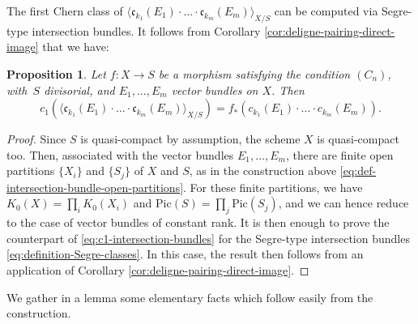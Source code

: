 \documentclass[JEP,XML,SOM,Unicode,published]{cedram}
\theoremstyle{plain}
\newtheorem{proposition}[theorem]{Proposition}
\theoremstyle{definition}
\newcommand{\cfrak}{\mathfrak c}
\newcommand{\Pic}{\mathrm{Pic}}
\begin{document}
The first Chern class of $\langle \cfrak_{k_{1}}(E_{1})\cdot\ldots \cdot \cfrak_{k_{m}}(E_{m})\rangle_{X/S}$ can be computed via Segre-type intersection bundles. It follows from Corollary \ref{cor:deligne-pairing-direct-image} that we have:
\begin{proposition}\label{prop:chernclassofIntbundle}
Let $f\colon X \to S$ be a morphism satisfying the condition $(C_n)$, with~$S$ divisorial, and $E_1, \ldots, E_m$ vector bundles on $X$. Then
\begin{equation}\label{eq:c1-intersection-bundles}
c_1 (\langle \cfrak_{k_{1}}(E_{1})\cdot\ldots \cdot \cfrak_{k_{m}}(E_{m})\rangle_{X/S}) = f_\ast (c_{k_{1}}(E_{1})\cdot\ldots \cdot c_{k_{m}}(E_{m}) ).
\end{equation}
\end{proposition}
\begin{proof}
Since $S$ is quasi-compact by assumption, the scheme $X$ is quasi-compact too. Then, associated with the vector bundles $E_{1},\ldots, E_{m}$, there are finite open partitions $\lbrace X_{i}\rbrace$ and $\lbrace S_{j}\rbrace$ of $X$ and $S$, as in the construction above \eqref{eq:def-intersection-bundle-open-partitions}. For these finite partitions, we have $K_{0}(X)=\prod_{i}K_{0}(X_{i})$ and $\Pic(S)=\prod_{j}\Pic(S_{j})$, and we can hence reduce to the case of vector bundles of constant rank. It is then enough to prove the counterpart of \eqref{eq:c1-intersection-bundles} for the Segre-type intersection bundles \eqref{eq:definition-Segre-classes}. In this case, the result then follows from an application of Corollary \ref{cor:deligne-pairing-direct-image}.
\end{proof}

We gather in a lemma some elementary facts which follow easily from the construction.
\end{document}
